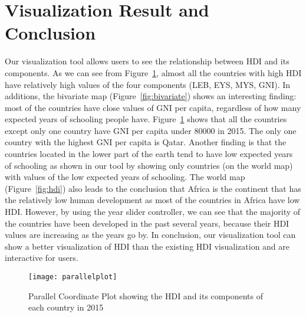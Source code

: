 \section{Visualization Result and Conclusion}
Our visualization tool allows users to see the relationship between HDI and its components. As we can see from Figure~\ref{fig:parallelplot}, almost all the countries with high HDI have relatively high values of the four components (LEB, EYS, MYS, GNI). In additions, the bivariate map (Figure~\ref{fig:bivariate}) shows an interesting finding: most of the countries have close values of GNI per capita, regardless of how many expected years of schooling people have. Figure~\ref{fig:parallelplot} shows that all the countries except only one country have GNI per capita under 80000 in 2015. The only one country with the highest GNI per capita is Qatar. Another finding is that the countries located in the lower part of the earth tend to have low expected years of schooling as shown in our tool by showing only countries (on the world map) with values of the low expected years of schooling. The world map (Figure~\ref{fig:hdi}) also leads to the conclusion that Africa is the continent that has the relatively low human development as most of the countries in Africa have low HDI. However, by using the year slider controller, we can see that the majority of the countries have been developed in the past several years, because their HDI values are increasing as the years go by. In conclusion, our visualization tool can show a better visualization of HDI than the existing HDI visualization and are interactive for users.

\begin{figure}[t]
    \centering
    \texttt{[image: parallelplot]}
    \caption{Parallel Coordinate Plot showing the HDI and its components of each country in 2015}
    \label{fig:parallelplot}
\end{figure}

